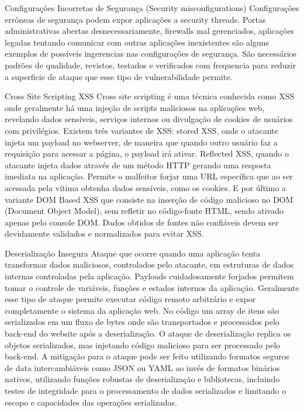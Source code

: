 Configurações Incorretas de Segurança (Security misconfigurations)
Configurações errôneas de segurança podem expor aplicações a security threads. Portas administrativas abertas desnecessariamente, firewalls mal gerenciados, aplicações legadas tentando comunicar com outras aplicações inexistentes são alguns exemplos de possíveis ingerencias nas configurações de segurança. São necessários padrões de qualidade, revistos, testados e verificados com frequencia para reduzir a superficie de ataque que esse tipo de vulnerabilidade permite.

Cross Site Scripting XSS
Cross site scripting é uma técnica conhecida como XSS onde geralmente há uma injeção de scripts maliciosos na aplicações web, revelando dados sensíveis, serviços internos ou divulgação de cookies de usuários com privilégios.
Existem três variantes de XSS: stored XSS, onde o atacante injeta um payload no webserver, de maneira que quando outro usuário faz a requisição para acessar a página, o payload irá ativar. Reflected XSS, quando o atacante injeta dados através de um método HTTP gerando uma resposta imediata na aplicação. Permite o malfeitor forjar uma URL específica que ao ser acessada pela vítima obtenha dados sensíveis, como os cookies. E por último a variante DOM Based XSS que consiste na inserção de código malicioso no DOM (Document Object Model), sem refletir no código-fonte HTML, sendo ativado apenas pelo console DOM.
Dados obtidos de fontes não confiáveis devem ser devidamente validados e normalizados para evitar XSS.

Deserialização Insegura
Ataque que ocorre quando uma aplicação tenta transformar dados maliciosos, controlados pelo atacante, em estruturas de dados internas controladas pela aplicação. Payloads cuidadosamente forjados permitem tomar o controle de variáveis, funções e estados internos da aplicação. Geralmente esse tipo de ataque permite executar código remoto arbitrário e expor completamente o sistema da aplicação web.
No código um array de itens são serializados em um fluxo de bytes onde são transportados e processados pelo back-end do website após a deserialização.
O ataque de deserialização replica os objetos serializados, mas injetando código malicioso para ser processado pelo back-end.
A mitigação para o ataque pode ser feito utilizando formatos seguros de data intercambiáveis como JSON ou YAML ao invés de formatos binários nativos, utilizando funções robustas de deserialização e bibliotecas, incluindo testes de integridade para o processamento de dados serializados e limitando o escopo e capacidades das operações serializadas.

